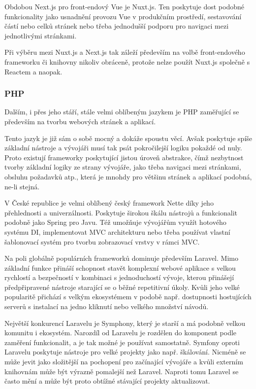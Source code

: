 		Obdobou Next.js pro front-endový Vue je Nuxt.js.
		Ten poskytuje dost podobné funkcionality jako usnadnění provozu Vue v produkčním prostředí, sestavování
		částí nebo celků stránek nebo třeba jednodušší podporu pro navigaci mezi jednotlivými stránkami. \cite{nuxtjs}

		Při výběru mezi Nuxt.js a Next.js tak záleží především na volbě front-endového frameworku či knihovny
		nikoliv obráceně, protože nelze použít Nuxt.js společně s Reactem a naopak.

		\subsubsection{PHP}

		Dalším, i přes jeho stáří, stále velmi oblíbeným jazykem je \Ac{PHP} zaměřující se především na tvorbu
		webových stránek a aplikací. \cite{php}

		Tento jazyk je již sám o sobě mocný a dokáže spoustu věcí.
		Avšak poskytuje spíše základní nástroje a vývojáři musí tak psát pokročilejší logiku pokaždé od nuly.
		Proto existují frameworky poskytující jistou úroveň abstrakce, čímž nezbytnost tvorby základní logiky ze strany
		vývojáře,
		jako třeba navigaci mezi stránkami, obsluhu požadavků atp., která je mnohdy pro většinu stránek a aplikací podobná,
		ne-li stejná. \cite{best_php_frameworks}

		V České republice je velmi oblíbený český framework Nette díky jeho přehlednosti a univerzálnosti.
		Poskytuje širokou škálu nástrojů a funkcionalit podobně jako Spring pro Javu.
		Též umožňuje vývojářům využít hotového systému \Ac{DI}, implementovat \Ac{MVC} architekturu nebo třeba používat
		vlastní šablonovací systém pro tvorbu zobrazovací vrstvy v rámci \Ac{MVC}. \cite{proc_pouzivat_nette}

		Na poli globálně populárních frameworků dominuje především Laravel.
		Mimo základní funkce přináší schopnost stavět komplexní webové aplikace s velkou rychlostí a bezpečností
		v kombinaci s jednoduchostí vývoje, kterou přinášejí předpřipravené nástroje starající se o běžné repetitivní
		úkoly.
		Kvůli jeho velké popularitě přichází s velkým ekosystémem v podobě např. dostupnosti hostujících serverů
		s instalací na jedno kliknutí nebo velkého množství návodů. \cite{best_php_frameworks}

		Největší konkurencí Laravelu je Symphony, který je starší a má podobně velkou komunitu i ekosystém.
		Narozdíl od Laravelu je rozdělen do komponent podle zaměření funkcionalit, a je tak možné je používat samostatně. \cite{best_php_frameworks}
		Symfony oproti Laravelu poskytuje nástroje pro velké projekty jako např. škálování.
		Nicméně se může jevit jako složitější na pochopení pro začínající vývojáře a kvůli externím knihovnám může být výrazně pomalejší
		než Laravel.
		Naproti tomu Laravel se často mění a může být proto obtížné stávající projekty aktualizovat.
		\cite{laravel_vs_symfony_in_2021}

